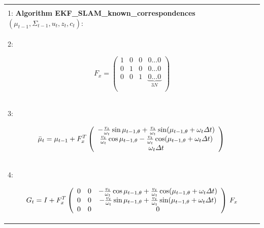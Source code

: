 \documentclass[10pt,a4paper]{article}
\begin{document}
\begin{table}[H]
\begin{center}
\begin{tabular}{|l|}
\hline
{}\\
1: \textbf{Algorithm EKF\_SLAM\_known\_correspondences}$(\mu_{t-1},\varSigma_{t-1},u_t,z_t,c_t):$ \\
2:\hspace{5mm}
\begin{minipage}{0.2\textwidth}
\begin{equation*}
F_x=\left(\begin{array}{cccc} 1&0&0&0...0\\
0&1&0&0...0\\
0&0&1&\underbrace{0...0}_{3N}\\ 
\end{array} \right)
\end{equation*}
\end{minipage}\\
3:\hspace{5mm}
\begin{minipage}{0.2\textwidth}
\begin{equation*}
\bar{\mu}_t=\mu_{t-1}+F_x^T\left(\begin{array}{c} 
-\frac{v_t}{\omega_t}\sin \mu_{t-1,\theta}+\frac{v_t}{\omega_t}\sin(\mu_{t-1,\theta}+\omega_t\varDelta t)\\
\frac{v_t}{\omega_t}\cos\mu_{t-1,\theta}-\frac{v_t}{\omega_t}\cos(\mu_{t-1,\theta}+\omega_t\varDelta t)\\
\omega_t\varDelta t\\ 
\end{array} \right)\\
\end{equation*}
\end{minipage}\\
4:\hspace{5mm}
\begin{minipage}{0.2\textwidth}
\begin{equation*}
G_t=I+F_x^T\left(\begin{array}{ccc} 
0&0&-\frac{v_t}{\omega_t}\cos \mu_{t-1,\theta}+\frac{v_t}{\omega_t}\cos(\mu_{t-1,\theta}+\omega_t\varDelta t)\\
0&0&-\frac{v_t}{\omega_t}\sin\mu_{t-1,\theta}+\frac{v_t}{\omega_t}\sin(\mu_{t-1,\theta}+\omega_t\varDelta t)\\
0&0&0\\ 
\end{array} \right)\,F_x\\

\end{equation*}
\end{minipage}
\end{tabular}
\end{center}
\end{table}
\end{document}
